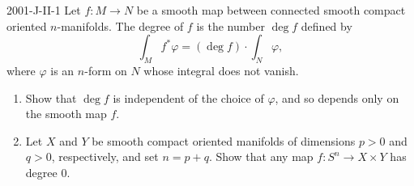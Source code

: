 \documentclass{article}
\begin{document}
	\begin{prb}{2001-J-II-1}
		Let $f: M \to N$ be a smooth map between connected smooth compact oriented $n$-manifolds. The degree of $f$ is the number $\deg{f}$ defined by 
		\begin{equation*}
			\int_{M} f^{\ast}\varphi = (\deg{f}) \cdot \int_{N}\varphi, 
		\end{equation*}
		where $\varphi$ is an $n$-form on $N$ whose integral does not vanish. \vspace{-0.25cm}
		\begin{enumerate}[itemsep =-2pt,label = (\alph{*})]
			\item Show that $\deg{f}$ is independent of the choice of $\varphi$, and so depends only on the smooth map $f$. 
			\item Let $X$ and $Y$ be smooth compact oriented manifolds of dimensions $p > 0$ and $q > 0$, respectively, and set $n = p + q$. Show that any map $f: S^{n} \to X \times Y$ has degree 0. 
		\end{enumerate}
	\end{prb}
\end{document}
